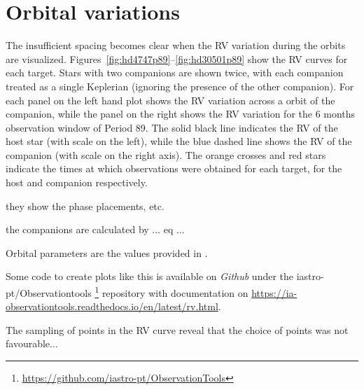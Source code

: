 \section{Orbital variations}

The insufficient spacing becomes clear when the RV variation during the orbits are visualized. Figures~\ref{fig:hd4747p89}--\ref{fig:hd30501p89} show the RV curves for each target.
Stars with two companions are shown twice, with each companion treated as a single Keplerian (ignoring the presence of the other companion).
For each panel on the left hand plot shows the RV variation across a orbit of the companion, while the panel on the right shows the RV variation for the 6 months observation window of Period 89.
The solid black line indicates the RV of the host star (with scale on the left), while the blue dashed line shows the RV of the companion (with scale on the right axis).
The orange crosses and red stars indicate the times at which observations were obtained for each target, for the host and companion respectively.

they show the phase placements, etc.

the companions are calculated by ... eq ...

Orbital parameters are the values provided in .

Some code to create plots like this is available on \textit{Github} under the iastro-pt/Observationtools \footnote{\href{https://github.com/iastro-pt/ObservationTools}{https://github.com/iastro-pt/ObservationTools}} repository with documentation on \href{Read the Docs}{https://ia-observationtools.readthedocs.io/en/latest/rv.html}.



The sampling of points in the RV curve reveal that the choice of points was not favourable...


